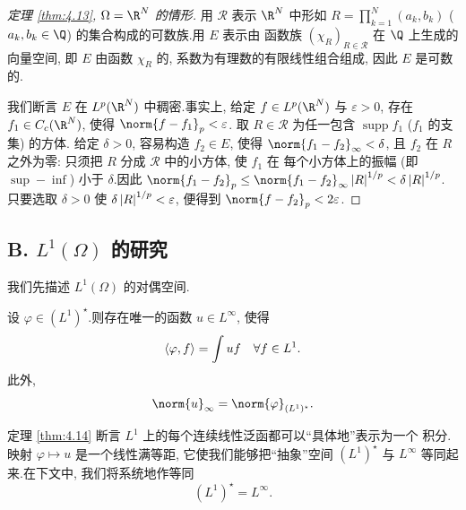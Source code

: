 \begin{proof}[定理 \ref{thm:4.13}, $\Omega=\R^N$ 的情形]
用 $\mathcal{R}$ 表示 $\R^N$ 中形如
$R=\prod_{k=1}^N(a_k,b_k)$ ($a_k,b_k\in\Q$) 的集合构成的可数族.用 $E$ 表示由
函数族 $(\chi_R)_{R\in\mathcal{R}}$ 在 $\Q$ 上生成的向量空间, 即 $E$ 由函数
$\chi_R$ 的, 系数为有理数的有限线性组合组成, 因此 $E$ 是可数的.

我们断言 $E$ 在 $L^p(\R^N)$ 中稠密.事实上, 给定 $f\in L^p(\R^N)$ 与
$\varepsilon>0$, 存在 $f_1\in C_c(\R^N)$, 使得 $\norm{f-f_1}_p<\varepsilon$.
取 $R\in\mathcal{R}$ 为任一包含 $\operatorname{supp}f_1$ ($f_1$ 的支集) 的方体.
给定 $\delta>0$, 容易构造 $f_2\in E$, 使得 $\norm{f_1-f_2}_\infty<\delta$, 且
$f_2$ 在 $R$ 之外为零: 只须把 $R$ 分成 $\mathcal{R}$ 中的小方体, 使 $f_1$ 在
每个小方体上的振幅 (即 $\sup-\inf$) 小于 $\delta$.因此
$\norm{f_1-f_2}_p\le\norm{f_1-f_2}_\infty\abs{R}^{1/p}<\delta\abs{R}^{1/p}$.
只要选取 $\delta>0$ 使 $\delta\left|R\right|^{1/p}<\varepsilon$, 便得到
$\norm{f-f_2}_p<2\varepsilon$.
\end{proof}

\subsection*{B. $L^1(\Omega)$ 的研究}

我们先描述 $L^1(\Omega)$ 的对偶空间.

\begin{keytheorem}
\label{thm:4.14}
设 $\varphi\in(L^1)^\star$.则存在唯一的函数 $u\in L^\infty$, 使得
\begin{equation*}
\left\langle \varphi,f\right\rangle=\int uf\quad\forall f\in L^1.
\end{equation*}
此外,
\begin{equation*}
\norm{u}_\infty=\norm{\varphi}_{(L^1)^\star}.
\end{equation*}
\end{keytheorem}

\begin{keyremark}
\label{rem:4.5}
定理  \ref{thm:4.14} 断言 $L^1$ 上的每个连续线性泛函都可以``具体地''表示为一个
积分.映射 $\varphi\mapsto u$ 是一个线性满等距, 它使我们能够把``抽象''空间
$(L^1)^\star$ 与 $L^\infty$ 等同起来.在下文中, 我们将系统地作等同
\begin{equation*}
\boxed{(L^1)^\star=L^\infty.}
\end{equation*}
\end{keyremark}

